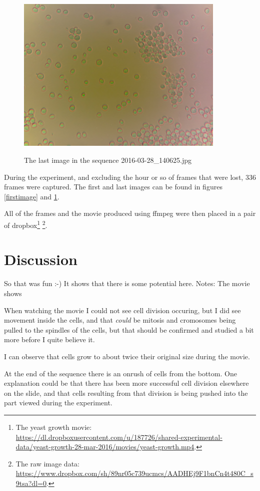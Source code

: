 \documentclass[12pt]{article}
\begin{document}
\begin{figure}[th]
\begin{center}
\includegraphics[width=10cm]{images/2016-03-28_140625.jpg}
\label{lastimage}
\caption{The last image in the sequence 2016-03-28\_140625.jpg}
\end{center}
\end{figure}

During the experiment, and excluding the hour or so of frames that
were lost, 336 frames were captured.  The first and last images can be
found in figures \ref{firstimage} and \ref{lastimage}. 

All of the frames and the movie produced using ffmpeg were then placed
in a pair of dropbox\footnote{The yeast growth movie: 
\url{https://dl.dropboxusercontent.com/u/187726/shared-experimental-data/yeast-growth-28-mar-2016/movies/yeast-growth.mp4}.}
\footnote{The raw image data: 
\url{https://www.dropbox.com/sh/89nr05c739ucmcs/AADHEj9F1bnCn4t480C_s9tsa?dl=0}.}.


\section{Discussion}

So that was fun :-)   It shows that there is some potential here.
Notes:  The movie shows

When watching the movie I could not see cell division occuring, but I
did see movement inside the cells, and that \emph{could} be mitosis and
cromosomes being pulled to the spindles of the cells, but that should
be confirmed and studied a bit more before I quite believe it.

I can observe that cells grow to about twice their original size
during the movie.

At the end of the sequence there is an onrush of cells from the
bottom.  One explanation could be that there has been more successful
cell division elsewhere on the slide, and that cells resulting from that division
is being pushed into the part viewed during the experiment.
\end{document}
